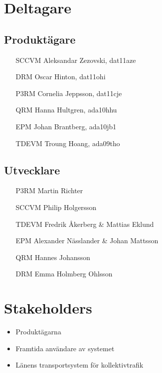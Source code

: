 \documentclass[a4paper]{article}
\begin{document}

	\section{Deltagare} %
	\label{sec:deltagare}
		\subsection{Produktägare}
			\begin{itemize}
				\item[SCCVM] Aleksandar Zezovski, dat11aze
				\item[DRM] Oscar Hinton, dat11ohi
				\item[P3RM] Cornelia Jeppsson, dat11cje
				\item[QRM] Hanna Hultgren, ada10hhu
				\item[EPM] Johan Brantberg, ada10jb1
				\item[TDEVM] Troung Hoang, ada09tho
			\end{itemize}
		
		\subsection{Utvecklare}
			\begin{itemize}
				\item[P3RM]	Martin Richter 
				\item[SCCVM]	Philip Holgersson
				\item[TDEVM]	Fredrik Åkerberg \& Mattias Eklund
				\item[EPM]	Alexander Nässlander \& Johan Mattsson
				\item[QRM]	Hannes Johansson
				\item[DRM]	Emma Holmberg Ohlsson
			\end{itemize}
		

	\section{Stakeholders} %
	\label{sec:stakeholders}
		\begin{itemize}
			\item Produktägarna
			\item Framtida användare av systemet
			\item Länens transportsystem för kollektivtrafik
		\end{itemize}
\end{document}
